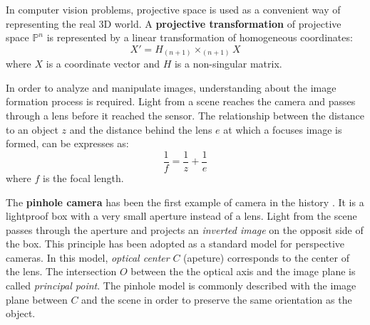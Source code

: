 In computer vision problems, projective space is used as a convenient way of representing the real 3D world.
A \textbf{projective transformation} of projective space $\mathds{P}^n$ is represented by a linear transformation of homogeneous coordinates:
\begin{equation}
X' = H_{(n+1)} \times _{(n+1)}X
\end{equation}
where $X$ is a coordinate vector and $H$ is a non-singular matrix.

In order to analyze and manipulate images, understanding about the image formation process is required.
Light from a scene reaches the camera and passes through a lens before it reached the sensor.
The relationship between the distance to an object $z$ and the distance behind the lens $e$ at which a focuses image is formed, can be expresses as:
\begin{equation}
\label{eq:optics}
\frac{1}{f} = \frac{1}{z} + \frac{1}{e}
\end{equation}
where $f$ is the focal length.

The \textbf{pinhole camera} has been the first example of camera in the history \cite{gernsheim1969history}.
It is a lightproof box with a very small aperture instead of a lens.
Light from the scene passes through the aperture and projects an \textit{inverted image} on the opposit side of the box.
This principle has been adopted as a standard model for perspective cameras.
In this model, \textit{optical center} $C$ (apeture) corresponds to the center of the lens.
The intersection $O$ between the the optical axis and the image plane is called \textit{principal point}.
The pinhole model is commonly described with the image plane between $C$ and the scene in order to preserve the same orientation as the object.

